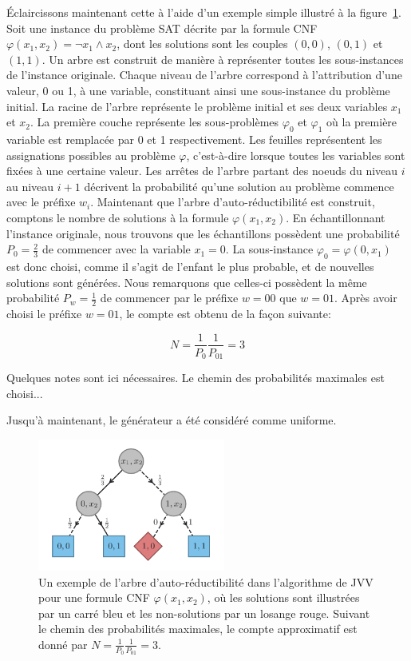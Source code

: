 Éclaircissons maintenant cette à l'aide d'un exemple simple illustré à la figure~\ref{fig:algorithme-jvv}. Soit une instance du problème SAT décrite par la formule CNF $\varphi(x_{1}, x_{2}) = \neg x_{1} \land x_{2}$, dont les solutions sont les couples $(0,0)$, $(0,1)$ et $(1,1)$. Un arbre est construit de manière à représenter toutes les sous-instances de l'instance originale. Chaque niveau de l'arbre correspond à l'attribution d'une valeur, 0 ou 1, à une variable, constituant ainsi une sous-instance du problème initial. La racine de l'arbre représente le problème initial et ses deux variables $x_{1}$ et $x_{2}$. La première couche représente les sous-problèmes $\varphi_{0}$ et $\varphi_{1}$ où la première variable est remplacée par 0 et 1 respectivement. Les feuilles représentent les assignations possibles au problème $\varphi$, c'est-à-dire lorsque toutes les variables sont fixées à une certaine valeur. Les arrêtes de l'arbre partant des noeuds du niveau $i$ au niveau $i+1$ décrivent la probabilité qu'une solution au problème commence avec le préfixe $w_{i}$. Maintenant que l'arbre d'auto-réductibilité est construit, comptons le nombre de solutions à la formule $\varphi(x_{1}, x_{2})$. En échantillonnant l'instance originale, nous trouvons que les échantillons possèdent une probabilité $P_{0}=\frac{2}{3}$ de commencer avec la variable $x_{1} = 0$. La sous-instance $\varphi_{0} = \varphi(0, x_{1})$ est donc choisi, comme il s'agit de l'enfant le plus probable, et de nouvelles solutions sont générées. Nous remarquons que celles-ci possèdent la même probabilité $P_{w}=\frac{1}{2}$ de commencer par le préfixe $w=00$ que $w=01$. Après avoir choisi le préfixe $w=01$, le compte est obtenu de la façon suivante:

\begin{equation}
   N = \frac{1}{P_{0}} \frac{1}{P_{01}} = 3
\end{equation}
  

Quelques notes sont ici nécessaires. Le chemin des probabilités maximales est choisi...


Jusqu'à maintenant, le générateur a été considéré comme uniforme. 

\begin{figure}[h]
    \centering
    \includegraphics[width=0.55\textwidth]{figures/jvv-algorithm.pdf}
    \caption[Algorithme de Jerrum-Valiant-Vazirani]{Un exemple de l'arbre d'auto-réductibilité dans l'algorithme de JVV pour une formule CNF $\varphi(x_{1}, x_{2})$, où les solutions sont illustrées par un carré bleu et les non-solutions par un losange rouge. Suivant le chemin des probabilités maximales, le compte approximatif est donné par $N = \frac{1}{P_{0}} \frac{1}{P_{01}} = 3$.}
    \label{fig:algorithme-jvv}
\end{figure}

